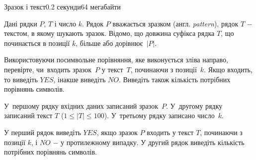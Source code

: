 \begin{problem}{Зразок і текст}{}{}{0.2 секунди}{64 мегабайти}

Дані рядки $P$, $T$ і число $k$. Рядок $P$ вважається зразком (англ. {\it pattern}), рядок $T$ $-$ текстом, в якому шукають зразок. 
Відомо, що довжина суфікса рядка $T$, що починається в позиції $k$, більше або дорівнює~$|P|$. 

Використовуючи посимвольне порівняння, яке виконується зліва направо, перевірте, чи~входить зразок~$P$ у текст~$T$, починаючи з позиції~$k$. 
Якщо входить, то виведіть $YES$, інакше виведіть $NO$. Виведіть також кількість потрібних порівнянь символів. 

\InputFile
У~першому рядку вхідних даних записаний зразок~$P$.
У~другому рядку записаний текст $T$ ($1 \le |T| \le 100$).
У~третьому рядку записано число~$k$.

\OutputFile
У перший рядок виведіть $YES$, якщо зразок $P$ входить у текст $T$, 
починаючи з позиції $k$, і $NO$ $-$ у протилежному випадку.
У другий рядок виведіть кількість потрібних порівнянь символів.

\Examples

\begin{example}
%
%
\end{example}

\end{problem}

